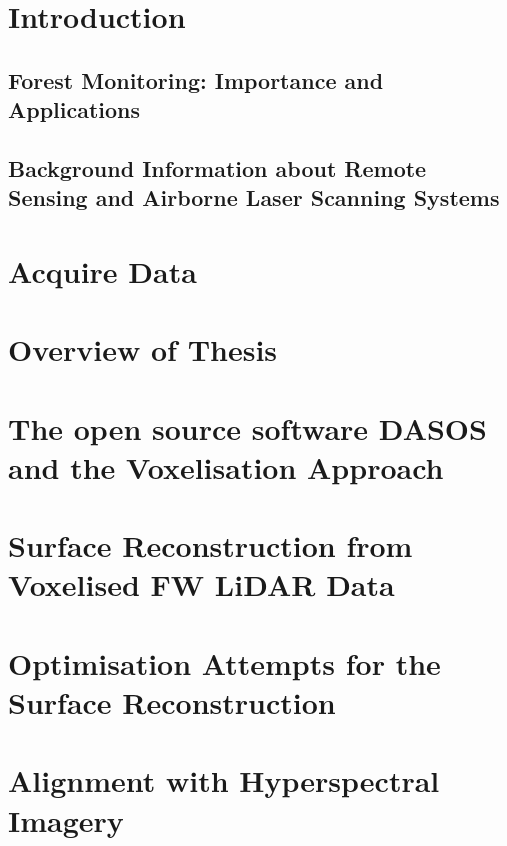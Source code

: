 \documentclass[11pt,nofootinbib]{report}
\begin{document}
	\chapter{Introduction} \label{Introduction} 	
		\section{Forest Monitoring: Importance and Applications}\label{sec:forestMonitoring}
%		
		\section{Background Information about Remote Sensing and Airborne Laser Scanning Systems}\label{Background}
%			
			\newpage
		
    \chapter{Acquire Data}\label{AcquireData}
%		 
	    \newpage
	\chapter{Overview of Thesis}\label{PipeLine}
%		

	\chapter{The open source software DASOS and the Voxelisation Approach}\label{DASOS_Voxelisation}
%			
	\newpage


		 		
	\chapter{Surface Reconstruction from Voxelised FW LiDAR Data}\label{Visualisations}
%		
		\newpage
    \chapter{Optimisation Attempts for the Surface Reconstruction}\label{Optimisations}
%        
			 \newpage
	\chapter{Alignment with Hyperspectral Imagery}\label{Alignment}
%		
		\newpage		
\end{document}
